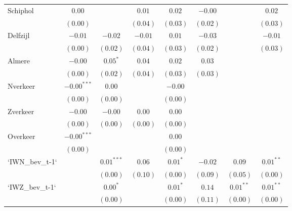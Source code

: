 \begin{center}
\begin{longtable}{l c c c c c c c }
Schiphol         & $0.00$        &              & $0.01$        & $0.02$        & $-0.00$       &               & $0.02$        \\
                 & $(0.00)$      &              & $(0.04)$      & $(0.03)$      & $(0.02)$      &               & $(0.03)$      \\
Delfzijl         & $-0.01$       & $-0.02$      & $-0.01$       & $0.01$        & $-0.03$       &               & $-0.01$       \\
                 & $(0.00)$      & $(0.02)$     & $(0.04)$      & $(0.03)$      & $(0.02)$      &               & $(0.03)$      \\
Almere           & $-0.00$       & $0.05^{*}$   & $0.04$        & $0.02$        & $0.03$        &               &               \\
                 & $(0.00)$      & $(0.02)$     & $(0.04)$      & $(0.03)$      & $(0.03)$      &               &               \\
Nverkeer         & $-0.00^{***}$ & $0.00$       &               & $-0.00$       &               &               &               \\
                 & $(0.00)$      & $(0.00)$     &               & $(0.00)$      &               &               &               \\
Zverkeer         & $-0.00$       & $-0.00$      & $0.00$        & $0.00$        &               &               &               \\
                 & $(0.00)$      & $(0.00)$     & $(0.00)$      & $(0.00)$      &               &               &               \\
Overkeer         & $-0.00^{***}$ &              &               & $0.00$        &               &               &               \\
                 & $(0.00)$      &              &               & $(0.00)$      &               &               &               \\
`IWN\_bev\_t-1`  &               & $0.01^{***}$ & $0.06$        & $0.01^{*}$    & $-0.02$       & $0.09$        & $0.01^{**}$   \\
                 &               & $(0.00)$     & $(0.10)$      & $(0.00)$      & $(0.09)$      & $(0.05)$      & $(0.00)$      \\
`IWZ\_bev\_t-1`  &               & $0.00^{*}$   &               & $0.01^{*}$    & $0.14$        & $0.01^{**}$   & $0.01^{**}$   \\
                 &               & $(0.00)$     &               & $(0.00)$      & $(0.11)$      & $(0.00)$      & $(0.00)$      \\

\end{longtable}
\end{center}
